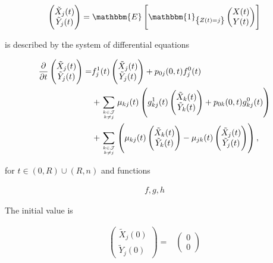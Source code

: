 \documentclass{book}
\newcommand{\1}[1]{\mathbbm{1}_{\left\lbrace #1 \right\rbrace}}
\newcommand{\expec}[1][def]{\mathbbm{E} \left[ #1 \right]}
\theoremstyle{break}
\theoremstyle{remark}
\numberwithin{equation}{section}
\begin{document}
\begin{align*}
\begin{pmatrix}\tilde{X}_j(t) \\ \tilde{Y}_j(t)\end{pmatrix} = \expec[\1{Z(t)=j}\begin{pmatrix}X(t) \\ Y(t)\end{pmatrix}]
\end{align*}

is described by the system of differential equations

\begin{align*}
\frac{\partial}{\partial t} \begin{pmatrix}\tilde{X}_j(t) \\ \tilde{Y}_j(t)\end{pmatrix} =& f_j^1(t) \begin{pmatrix}\tilde{X}_j(t) \\ \tilde{Y}_j(t)\end{pmatrix} + p_{0j}(0,t) f_j^0(t) \\
&+ \sum_{k \in \mathcal{J} \atop k \neq j} \mu_{kj}(t) \left( g_{kj}^1(t) \begin{pmatrix}\tilde{X}_k(t) \\ \tilde{Y}_k(t)\end{pmatrix} + p_{0k}(0,t) g_{kj}^0(t) \right) \\
&+ \sum_{k \in \mathcal{J} \atop k \neq j} \left( \mu_{kj}(t) \begin{pmatrix}\tilde{X}_k(t) \\ \tilde{Y}_k(t)\end{pmatrix} - \mu_{jk}(t) \begin{pmatrix}\tilde{X}_j(t) \\ \tilde{Y}_j(t)\end{pmatrix} \right),
\end{align*}

for $t \in (0,R)\cup(R,n)$ and functions

\begin{align*}
	f,g,h
\end{align*}


The initial value is

\begin{align*}
\begin{pmatrix}\tilde{X}_j(0) \\ \tilde{Y}_j(0)\end{pmatrix} =& \begin{pmatrix}0 \\ 0\end{pmatrix}
\end{align*}
\end{document}
